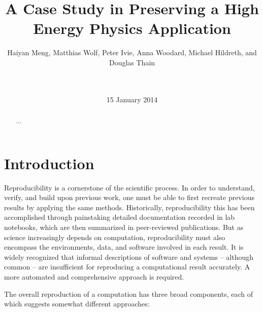 \documentclass{acm_proc_article-sp}
\begin{document}
\title{A Case Study in Preserving a High Energy Physics Application}
\author{
Haiyan Meng, Matthias Wolf, Peter Ivie, Anna Woodard, Michael Hildreth, and Douglas Thain\\
\\
\\
}
\date{15 January 2014}
\maketitle

\begin{abstract}
...
\end{abstract}



\section{Introduction}

Reproducibility is a cornerstone of the scientific process.
In order to understand, verify, and build upon previous work,
one must be able to first recreate previous results by applying
the same methods. Historically, reproducibility this has been
accomplished through painstaking detailed documentation recorded
in lab notebooks, which are then summarized in peer-reviewed publications.
But as science increasingly depends on computation,
reproducibility must also encompass the environments, data, and software
involved in each result. It is widely recognized that informal
descriptions of software and systems -- although common -- are insufficient
for reproducing a computational result accurately.
A more automated and comprehensive approach is required.

The overall reproduction of a computation has three broad components,
each of which suggests somewhat different approaches:
\end{document}
